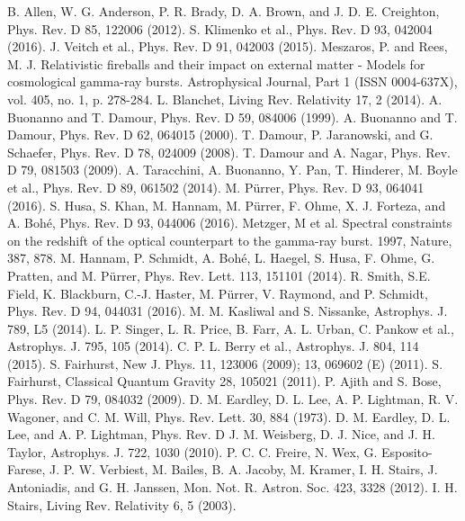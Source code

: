 \documentclass[binding=0.6cm, LaM]{sapthesis}
\begin{document}
\begin{thebibliography}{500}
	 B. Allen, W. G. Anderson, P. R. Brady, D. A. Brown, and J. D. E. Creighton, Phys. Rev. D 85, 122006 (2012).
	 S. Klimenko et al., Phys. Rev. D 93, 042004 (2016).
	 J. Veitch et al., Phys. Rev. D 91, 042003 (2015).
	 Meszaros, P. and Rees, M. J. Relativistic fireballs and their impact on external matter - Models for cosmological gamma-ray bursts. Astrophysical Journal, Part 1 (ISSN 0004-637X), vol. 405, no. 1, p. 278-284. 
	 L. Blanchet, Living Rev. Relativity 17, 2 (2014).
	 A. Buonanno and T. Damour, Phys. Rev. D 59, 084006 (1999).
	 A. Buonanno and T. Damour, Phys. Rev. D 62, 064015 (2000).
	 T. Damour, P. Jaranowski, and G. Schaefer, Phys. Rev. D 78, 024009 (2008).
	 T. Damour and A. Nagar, Phys. Rev. D 79, 081503 (2009).
	 A. Taracchini, A. Buonanno, Y. Pan, T. Hinderer, M. Boyle et al., Phys. Rev. D 89, 061502 (2014).
	 M. Pürrer, Phys. Rev. D 93, 064041 (2016).
	 S. Husa, S. Khan, M. Hannam, M. Pürrer, F. Ohme, X. J. Forteza, and A. Bohé, Phys. Rev. D 93, 044006 (2016). 
	 Metzger, M et al. Spectral constraints on the redshift of the optical counterpart to the gamma-ray burst. 1997, Nature, 387, 878.
	 M. Hannam, P. Schmidt, A. Bohé, L. Haegel, S. Husa, F. Ohme, G. Pratten, and M. Pürrer, Phys. Rev. Lett. 113, 151101 (2014).
	 R. Smith, S.E. Field, K. Blackburn, C.-J. Haster, M. Pürrer, V. Raymond, and P. Schmidt, Phys. Rev. D 94, 044031 (2016).
	 M. M. Kasliwal and S. Nissanke, Astrophys. J. 789, L5 (2014). 
	 L. P. Singer, L. R. Price, B. Farr, A. L. Urban, C. Pankow et al., Astrophys. J. 795, 105 (2014). 
	 C. P. L. Berry et al., Astrophys. J. 804, 114 (2015). 
	 S. Fairhurst, New J. Phys. 11, 123006 (2009); 13, 069602 (E) (2011). 
 	 S. Fairhurst, Classical Quantum Gravity 28, 105021 (2011). 
 	 P. Ajith and S. Bose, Phys. Rev. D 79, 084032 (2009). 
 	 D. M. Eardley, D. L. Lee, A. P. Lightman, R. V. Wagoner, and C. M. Will, Phys. Rev. Lett. 30, 884 (1973). 
 	 D. M. Eardley, D. L. Lee, and A. P. Lightman, Phys. Rev. D 
 	 J. M. Weisberg, D. J. Nice, and J. H. Taylor, Astrophys. J. 722, 1030 (2010).
 	 P. C. C. Freire, N. Wex, G. Esposito-Farese, J. P. W. Verbiest, M. Bailes, B. A. Jacoby, M. Kramer, I. H. Stairs, J. Antoniadis, and G. H. Janssen, Mon. Not. R. Astron. Soc. 423, 3328 (2012).
 	 I. H. Stairs, Living Rev. Relativity 6, 5 (2003).

\end{thebibliography}
\end{document}
